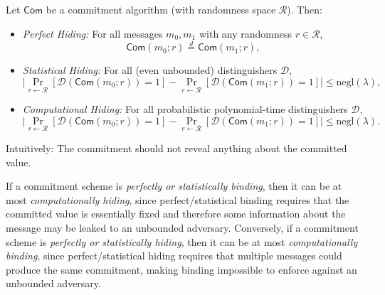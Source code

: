 \myspace

\begin{definition}[Hiding]
Let $\mathsf{Com}$ be a commitment algorithm (with randomness space $\mathcal{R}$). Then:
\begin{itemize}
    \item \emph{Perfect Hiding:} For all messages $m_0, m_1$ with any randomness $r \in \mathcal{R}$,
    \[
    \mathsf{Com}(m_0; r) \overset{d}{=} \mathsf{Com}(m_1; r),
    \]
    
    \item \emph{Statistical Hiding:} For all (even unbounded) distinguishers $\mathcal{D}$,
    \[
    \Big| \Pr_{r \gets \mathcal{R}}[\mathcal{D}(\mathsf{Com}(m_0; r)) = 1] - 
    \Pr_{r \gets \mathcal{R}}[\mathcal{D}(\mathsf{Com}(m_1; r)) = 1] \Big| \le \mathrm{negl}(\lambda),
    \]
    
    \item \emph{Computational Hiding:} For all probabilistic polynomial-time distinguishers $\mathcal{D}$,
    \[
    \Big| \Pr_{r \gets \mathcal{R}}[\mathcal{D}(\mathsf{Com}(m_0; r)) = 1] - 
    \Pr_{r \gets \mathcal{R}}[\mathcal{D}(\mathsf{Com}(m_1; r)) = 1] \Big| \le \mathrm{negl}(\lambda).
    \]
\end{itemize}

\noindent Intuitively: The commitment should not reveal anything about the committed value.
\end{definition}

\myspace

\begin{remark}
If a commitment scheme is \emph{perfectly or statistically binding}, then it can be at most \emph{computationally hiding}, since perfect/statistical binding requires that the committed value is essentially fixed and therefore some information about the message may be leaked to an unbounded adversary.  
Conversely, if a commitment scheme is \emph{perfectly or statistically hiding}, then it can be at most \emph{computationally binding}, since perfect/statistical hiding requires that multiple messages could produce the same commitment, making binding impossible to enforce against an unbounded adversary.
\end{remark}


\myspace

